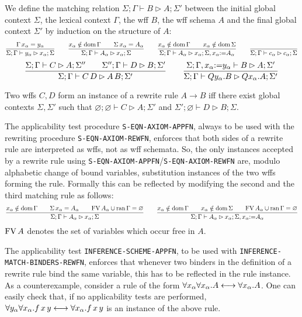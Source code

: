We define the matching relation $\Sigma;\Gamma\vdash B\rhd A;\Sigma'$ between
the initial global context $\Sigma$, the lexical context $\Gamma$, the wff $B$,
the wff schema $A$ and the final global context $\Sigma'$ by induction on the
structure of $A$:
\[
\frac{\Gamma\,x_{\alpha}=y_{\alpha}}
     {\Sigma;\Gamma\vdash y_{\alpha}\rhd x_{\alpha};\Sigma}
\qquad
\frac{x_{\alpha}\notin\textup{dom}\,\Gamma\qquad\Sigma\,x_{\alpha}=A_{\alpha}}
     {\Sigma;\Gamma\vdash A_{\alpha}\rhd x_{\alpha};\Sigma}
\qquad
\frac{x_{\alpha}\notin\textup{dom}\,\Gamma\qquad x_{\alpha}\notin\textup{dom}\,\Sigma}
     {\Sigma;\Gamma\vdash A_{\alpha}\rhd x_{\alpha};\Sigma,x_{\alpha}{:=}A_{\alpha}}
\qquad
\frac{~}{\Sigma;\Gamma\vdash c_{\alpha}\rhd c_{\alpha};\Sigma}
\]\[
\frac{\Sigma;\Gamma\vdash C\rhd A;\Sigma''\qquad
      \Sigma'';\Gamma\vdash D\rhd B;\Sigma'}
     {\Sigma;\Gamma\vdash C\,D\rhd A\,B;\Sigma'}
\qquad
\frac{\Sigma;\Gamma,x_{\alpha}{:=}y_{\alpha}\vdash B\rhd A;\Sigma'}
     {\Sigma;\Gamma\vdash Qy_{\alpha}.B\rhd Qx_{\alpha}.A;\Sigma'}
\]

Two wffs $C,D$ form an instance of a rewrite rule $A\longrightarrow B$
iff there exist global contexts $\Sigma,\Sigma'$ such that
$\varnothing;\varnothing\vdash C\rhd A;\Sigma'$ and
$\Sigma';\varnothing\vdash D\rhd B;\Sigma$.

The applicability test procedure \texttt{S-EQN-AXIOM-APPFN}, always to be used
with the rewriting procedure \texttt{S-EQN-AXIOM-REWFN}, enforces that both
sides of a rewrite rule are interpreted as wffs, not as wff schemata. So,
the only instances accepted by a rewrite rule using
\texttt{S-EQN-AXIOM-APPFN}/\texttt{S-EQN-AXIOM-REWFN} are, modulo alphabetic
change of bound variables, substitution instances of the two wffs forming the
rule. Formally this can be reflected by modifying the second and the third
matching rule as follows:
\[
\frac{x_{\alpha}\notin\textup{dom}\,\Gamma\qquad\Sigma\,x_{\alpha}=A_{\alpha}\qquad
      \textup{FV}\,A_{\alpha}\cup\textup{ran}\,\Gamma=\varnothing}
     {\Sigma;\Gamma\vdash A_{\alpha}\rhd x_{\alpha};\Sigma}
\qquad
\frac{x_{\alpha}\notin\textup{dom}\,\Gamma\qquad x_{\alpha}\notin\textup{dom}\,\Sigma\qquad
      \textup{FV}\,A_{\alpha}\cup\textup{ran}\,\Gamma=\varnothing}
     {\Sigma;\Gamma\vdash A_{\alpha}\rhd x_{\alpha};\Sigma,x_{\alpha}{:=}A_{\alpha}}
\]
$\textup{FV}\,A$ denotes the set of variables which occur free in $A$.

The applicability test \texttt{INFERENCE-SCHEME-APPFN}, to be used with
\texttt{INFERENCE-MATCH-BINDERS-REWFN}, enforces that whenever two binders in
the definition of a rewrite rule bind the same variable, this has to be
reflected in the rule instance. As a counterexample, consider a rule of the
form $\forall x_{\alpha}\forall x_{\alpha}.A\longleftrightarrow
\forall x_{\alpha}.A$. One can easily check that, if no
applicability tests are performed,
$\forall y_{\alpha}\forall x_{\alpha}.f\,x\,y\longleftrightarrow
\forall x_{\alpha}.f\,x\,y$ is an instance of the above rule.

